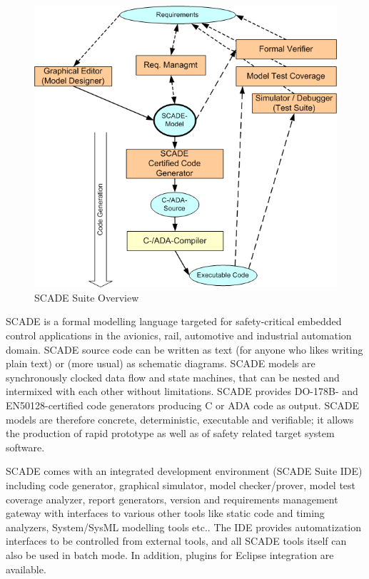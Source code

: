 \documentclass{./template/openetcs_report}
\begin{document}
\begin{figure}[h]
\centering
\includegraphics[scale=0.6]{SCADE_Overview.png}
\caption{SCADE Suite Overview}
\label{fig:SCADE_Suite_Overview}
\end{figure}

	
SCADE is a formal modelling language targeted for safety-critical embedded control applications in the avionics, rail, automotive and industrial automation domain. SCADE source code can be written as text (for anyone who likes writing plain text) or (more usual) as schematic diagrams. SCADE models are synchronously clocked data flow and state machines, that can be nested and intermixed with each other without limitations. 
SCADE provides DO-178B- and EN50128-certified code generators producing C or ADA code as output. SCADE models are therefore concrete, deterministic, executable and verifiable; it allows the production of rapid prototype as well as of safety related target system software. 

SCADE comes with an integrated development environment (SCADE Suite IDE) including code generator, graphical simulator, model checker/prover, model test coverage analyzer, report generators, version and requirements management gateway with interfaces to various other tools like static code and timing analyzers, System/SysML modelling tools etc.. The IDE provides automatization interfaces to be controlled from external tools, and all SCADE tools itself can also be used in batch mode. In addition, plugins for Eclipse integration are available. 
\end{document}
